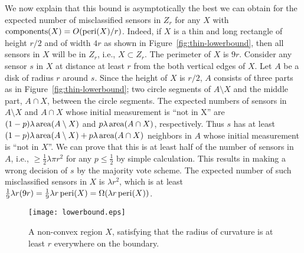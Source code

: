 \documentclass{article}
\def\area{\mathop{\rm area}}
\def\peri{\mathop{\rm peri}}
\def\components{\mathop{\rm components}}
\begin{document}
\par
We now explain that this bound is asymptotically the best we can obtain for the expected number of misclassified sensors in $Z_r$ for any $X$ with $\components(X) = O (\peri(X)/r)$. Indeed, if $X$ is a thin and long rectangle of height $r/2$ and of width $4r$ as shown in Figure~\ref{fig:thin-lowerbound}, then all sensors in $X$ will be in $Z_r$, i.e., $X\subset Z_r$. The perimeter of $X$ is $9r$. Consider any sensor $s$ in $X$ at distance at least $r$ from the both vertical edges of $X$. Let $A$ be a disk of radius $r$ around $s$. Since the height of $X$ is $r/2$, $A$ consists of three parts as in Figure~\ref{fig:thin-lowerbound}; two circle segments of $A \setminus X$ and the middle part, $A\cap X$, between the circle segments. The expected numbers of sensors in $A\setminus X$ and $A\cap X$ whose initial measurement is ``not in X'' are $(1-p)\lambda\area(A\setminus X)$ and $p\lambda\area(A\cap X)$, respectively. Thus $s$ has at least $(1-p)\lambda\area(A\setminus X)+p\lambda\area(A\cap X)$ neighbors in $A$ whose initial measurement is ``not in $X$''. We can prove that this is at least half of the number of sensors in $A$, i.e., $\geq \frac{1}{2}\lambda\pi r^2$ for any $p \leq \frac{1}{2}$ by simple calculation. This results in making a wrong decision of $s$ by the majority vote scheme. The expected number of such misclassified sensors in $X$ is $\lambda r^2$, which is at least $\frac{1}{9}\lambda r(9r) = \frac{1}{9}\lambda r \peri(X) = \Omega(\lambda r \peri(X))$.

\begin{figure}
\centering
    \texttt{[image: lowerbound.eps]}
\caption{A non-convex region $X$, satisfying that the radius of curvature is at least $r$ everywhere on the boundary.}
\label{fig:lowerbound}
\end{figure}
\end{document}
